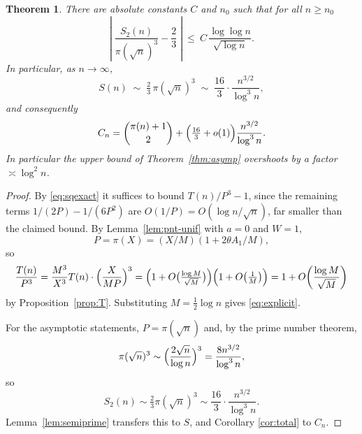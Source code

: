 \documentclass[a4paper,11pt,oneside,reqno]{amsart}
\theoremstyle{definition}
\theoremstyle{remark}
\theoremstyle{plain}
\newtheorem{theorem}[definition]{Theorem}
\begin{document}
\begin{theorem}\label{thm:error}
  There are absolute constants \(C\) and \(n_0\) such that for all \(n \ge n_0\)
  \begin{equation}\label{eq:explicit}
    \left|\;\frac{S_2(n)}{\pi(\sqrt n)^{3}}-\frac{2}{3}\;\right|
      \ \le \ C\,\frac{\log\log n}{\sqrt{\log n}} .
  \end{equation}
  In particular, as \(n \to \infty\),
  \begin{equation}\label{eq:Sasymp}
    S(n)\;\sim \;\tfrac{2}{3}\,\pi(\sqrt n)^{3}
            \;\sim \;\frac{16}{3} \cdot \frac{n^{3/2}}{\log^{3}n},
  \end{equation}
  and consequently
  \begin{equation}\label{eq:Cnexpand}
    C_n = \binom{\pi(n)+1}{2}
        +\Bigl(\tfrac{16}{3}+o(1)\Bigr)\frac{n^{3/2}}{\log^{3}n}.
  \end{equation}
  In particular the upper bound of Theorem~\ref{thm:asymp} overshoots by a
  factor \(\asymp\log^{2}n\).
\end{theorem}

\begin{proof}
  By \eqref{eq:sqexact} it suffices to bound \(T(n)/P^{3}-1\), since the
  remaining terms \(1/(2P)-1/(6P^{2})\) are \(O(1/P) = O(\log n/\sqrt n)\), far
  smaller than the claimed bound. By Lemma~\ref{lem:pnt-unif} with \(a = 0\) and
  \(W = 1\),
  \[
    P = \pi(X) = (X/M)(1+2\theta A_1/M),
  \]
  so
  \[
    \frac{T(n)}{P^{3}} = \frac{M^{3}}{X^{3}}T(n) \cdot \Bigl(\frac{X}{MP}\Bigr)^{3}
      =\Bigl(1+O\bigl(\tfrac{\log M}{\sqrt M}\bigr)\Bigr)
       \Bigl(1+O\bigl(\tfrac{1}{M}\bigr)\Bigr)
      =1+O\!\left(\frac{\log M}{\sqrt M}\right)
  \]
  by Proposition~\ref{prop:T}. Substituting \(M = \tfrac{1}{2}\log n\) gives
  \eqref{eq:explicit}.

  For the asymptotic statements, \(P = \pi(\sqrt n)\) and, by the prime number
  theorem,
  \[
    \pi(\sqrt n)^{3} \sim \Bigl(\frac{2\sqrt n}{\log n}\Bigr)^{3} = \frac{8n^{3/2}}{\log^{3}n},
  \]
  so
  \[
    S_2(n) \sim \tfrac{2}{3}\pi(\sqrt n)^{3} \sim \frac{16}{3}\cdot\frac{n^{3/2}}{\log^{3}n}.
  \]
  Lemma~\ref{lem:semiprime} transfers this to \(S\), and Corollary
  \ref{cor:total} to \(C_n\).
\end{proof}
\end{document}
